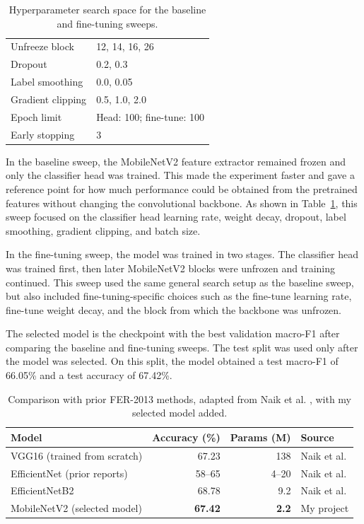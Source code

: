 \begin{table}[h]
\begin{minipage}{0.48\textwidth}
\begin{tabular}{ll}
            Unfreeze block & 12, 14, 16, 26 \\
            Dropout & 0.2, 0.3 \\
            Label smoothing & 0.0, 0.05 \\
            Gradient clipping & 0.5, 1.0, 2.0 \\
            Epoch limit & Head: 100; fine-tune: 100 \\
            Early stopping & 3 \\
            \hline
        \end{tabular}
    \end{minipage}
    \caption{Hyperparameter search space for the baseline and fine-tuning sweeps.}
    \label{tab:sweep-hyperparameters-comparison}
\end{table}

In the baseline sweep, the MobileNetV2 feature extractor remained frozen and only the classifier head was trained. This made the experiment faster and gave a reference point for how much performance could be obtained from the pretrained features without changing the convolutional backbone. As shown in Table~\ref{tab:sweep-hyperparameters-comparison}, this sweep focused on the classifier head learning rate, weight decay, dropout, label smoothing, gradient clipping, and batch size.

In the fine-tuning sweep, the model was trained in two stages. The classifier head was trained first, then later MobileNetV2 blocks were unfrozen and training continued. This sweep used the same general search setup as the baseline sweep, but also included fine-tuning-specific choices such as the fine-tune learning rate, fine-tune weight decay, and the block from which the backbone was unfrozen.

The selected model is the checkpoint with the best validation macro-F1 after comparing the baseline and fine-tuning sweeps. The test split was used only after the model was selected. On this split, the model obtained a test macro-F1 of 66.05\% and a test accuracy of 67.42\%.

\begin{table}[h]
    \centering
    \begin{tabular}{lrrl}
        \hline
        Model & Accuracy (\%) & Params (M) & Source \\
        \hline
        VGG16 (trained from scratch) & 67.23 & 138 & Naik et al. \\
        EfficientNet (prior reports) & 58--65 & 4--20 & Naik et al. \\
        EfficientNetB2 & 68.78 & 9.2 & Naik et al. \\
        MobileNetV2 (selected model) & \textbf{67.42} & \textbf{2.2} & My project \\
        \hline
    \end{tabular}
    \caption{Comparison with prior FER-2013 methods, adapted from Naik et al. \cite{naik2026efficientnetb2}, with my selected model added.}
    \label{tab:fer2013-prior-methods-comparison}
\end{table}

